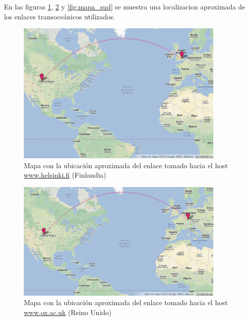 En las figuras \ref{fig:mapa_fin}, \ref{fig:mapa_ing} y \ref{fig:mapa_sud} se muestra una localizacion aproximada de los enlaces transoceánicos utilizados.\\

\begin{figure}[H]
  \centering
    \includegraphics[width=0.9\textwidth]{imgs/finlandia_enlace_1.png}
    \caption{Mapa con la ubicación aproximada del enlace tomado hacia el host \url{www.helsinki.fi} (Finlandia)}
    \label{fig:mapa_fin}
\end{figure}    

\begin{figure}[H]
  \centering
    \includegraphics[width=0.9\textwidth]{imgs/inglaterra_enlace_1.png}
    \caption{Mapa con la ubicación aproximada del enlace tomado hacia el host \url{www.ox.ac.uk} (Reino Unido)}
    \label{fig:mapa_ing}
\end{figure}

